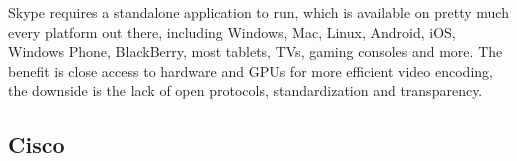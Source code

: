 Skype requires a standalone application to run, which is available on pretty much every platform out there, including Windows, Mac, Linux, Android, iOS, Windows Phone, BlackBerry, most tablets, TVs, gaming consoles and more. The benefit is close access to hardware and GPUs for more efficient video encoding, the downside is the lack of open protocols, standardization and transparency.


\subsection{Cisco}

